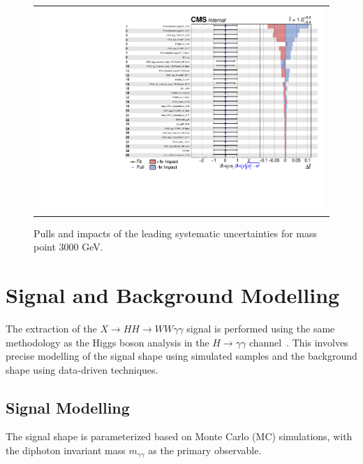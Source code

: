 \begin{figure}[hbt!]
    \centering
    \begin{tabular}{c}
        \includegraphics[width=0.9\linewidth]{figures/Impact/MX3000_MH125.pdf} \\
    \end{tabular}
  \caption{Pulls and impacts of the leading systematic uncertainties for mass point 3000 GeV.
  }
  \label{fig:impacts_2}
\end{figure}


\section{Signal and Background Modelling}
\label{sec:signal_background_modelling}

The extraction of the \(X \to HH \to WW\gamma\gamma\) signal is performed using the same methodology as the Higgs boson analysis in the \(H \to \gamma\gamma\) channel~\cite{CMS:2020xrn}. This involves precise modelling of the signal shape using simulated samples and the background shape using data-driven techniques.

\subsection{Signal Modelling}
The signal shape is parameterized based on Monte Carlo (MC) simulations, with the diphoton invariant mass \(m_{\gamma\gamma}\) as the primary observable.

